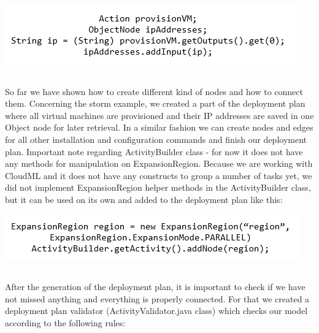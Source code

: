\begin{center}
	\includegraphics{./Figures/IP}
	\begin{lstlisting}[mathescape,caption={Adding data to the Object node},label={lst:10}]
	\end{lstlisting}
\end{center} 

\noindent So far we have shown how to create different kind of nodes and how to connect them. Concerning the storm example, we created a part of the deployment plan where all virtual machines are provisioned and their IP addresses are saved in one Object node for later retrieval. In a similar fashion we can create nodes and edges for all other installation and configuration commands and finish our deployment plan. Important note regarding ActivityBuilder class - for now it does not have any methods for manipulation on ExpansionRegion. Because we are working with CloudML and it does not have any constructs to group a number of tasks yet, we did not implement ExpansionRegion helper methods in the ActivityBuilder class, but it can be used on its own and added to the deployment plan like this:

\begin{center}
	\includegraphics{./Figures/Region}
	\begin{lstlisting}[mathescape,caption={Expansion Region node},label={lst:11}]
	\end{lstlisting}
\end{center} 

\noindent After the generation of the deployment plan, it is important to check if we have not missed anything and everything is properly connected. For that we created a deployment plan validator (ActivityValidator.java class) which checks our model according to the following rules:

